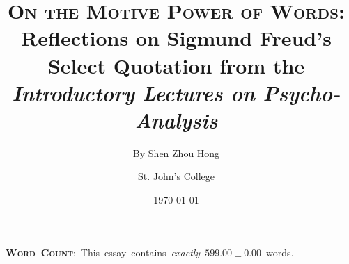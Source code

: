 \documentclass[
  12pt,       %
  letter,    %
  final,      %
  onecolumn,  %
  oneside,    %
  notitlepage %
]{article}
\title{
  \textbf{\textsc{On the Motive Power of Words}}: \\
  Reflections on Sigmund Freud's \\
  Select Quotation from the \\
  \emph{Introductory Lectures on Psycho-Analysis}
}
\author{
  By Shen Zhou Hong \and St. John's College
}
\date{\today}
\begin{document}
\maketitle

\noindent
\mbox{
\textbf{\textsc{Word Count}}:
This essay contains \emph{exactly} $599.00 \pm 0.00$ words.
}

% 



%
\end{document}
